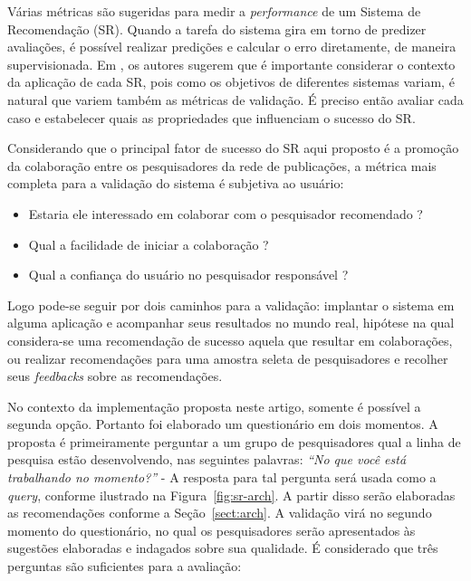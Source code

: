 \documentclass[12pt]{article}
\begin{document}
Várias métricas são sugeridas para medir a \textit{performance} de um Sistema de Recomendação (SR). Quando a tarefa do sistema gira em torno de predizer avaliações, é possível realizar predições e calcular o erro diretamente, de maneira supervisionada. Em \cite{shani2011evaluating}, os autores sugerem que é importante considerar o contexto da aplicação de cada SR, pois como os objetivos de diferentes sistemas variam, é natural que variem também as métricas de validação. É preciso então avaliar cada caso e estabelecer quais as propriedades que influenciam o sucesso do SR.

Considerando que o principal fator de sucesso do SR aqui proposto é a promoção da colaboração entre os pesquisadores da rede de 
publicações, a métrica mais completa para a validação do sistema é subjetiva ao usuário: 

\begin{itemize}
  \item Estaria ele interessado em colaborar com o pesquisador recomendado ?
  \item Qual a facilidade de iniciar a colaboração ?
  \item Qual a confiança do usuário no pesquisador responsável ?  
\end{itemize}

Logo pode-se seguir por dois caminhos para a validação: implantar o sistema em alguma aplicação e acompanhar seus resultados no 
mundo real, hipótese na qual considera-se uma recomendação de sucesso aquela que resultar em colaborações, ou realizar 
recomendações para uma amostra seleta de pesquisadores e recolher seus \textit{feedbacks} sobre as recomendações.

No contexto da implementação proposta neste artigo, somente é possível a segunda opção. Portanto foi elaborado um questionário 
em dois momentos. A proposta é primeiramente perguntar a um grupo de pesquisadores qual a linha de pesquisa estão desenvolvendo, 
nas seguintes palavras: \textit{“No que você está trabalhando no momento?”} - A resposta para tal pergunta será usada como a 
\textit{query}, conforme ilustrado na Figura~\ref{fig:sr-arch}. A partir disso serão elaboradas as recomendações conforme a Seção~\ref{sect:arch}. A validação virá no segundo momento do questionário, no qual os pesquisadores serão apresentados às sugestões elaboradas e indagados sobre sua qualidade. É considerado que três perguntas são suficientes para a avaliação:
\end{document}
